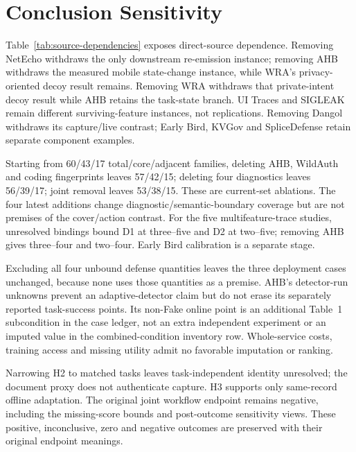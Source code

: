 \section{Conclusion Sensitivity}\label{app:claim-sensitivity}\label{sec:claim-sensitivity}
Table~\ref{tab:source-dependencies} exposes direct-source dependence. Removing NetEcho withdraws the only downstream re-emission instance; removing AHB withdraws the measured mobile state-change instance, while WRA's privacy-oriented decoy result remains. Removing WRA withdraws that private-intent decoy result while AHB retains the task-state branch. UI Traces and SIGLEAK remain different surviving-feature instances, not replications. Removing Dangol withdraws its capture/live contrast; Early Bird, KVGov and SpliceDefense retain separate component examples.

Starting from 60/43/17 total/core/adjacent families, deleting AHB, WildAuth and coding fingerprints leaves 57/42/15; deleting four diagnostics leaves 56/39/17; joint removal leaves 53/38/15. These are current-set ablations. The four latest additions change diagnostic/semantic-boundary coverage but are not premises of the cover/action contrast. For the five multifeature-trace studies, unresolved bindings bound D1 at three--five and D2 at two--five; removing AHB gives three--four and two--four. Early Bird calibration is a separate stage.

Excluding all four unbound defense quantities leaves the three deployment cases unchanged, because none uses those quantities as a premise. AHB's detector-run unknowns prevent an adaptive-detector claim but do not erase its separately reported task-success points. Its non-Fake online point is an additional Table~1 subcondition in the case ledger, not an extra independent experiment or an imputed value in the combined-condition inventory row. Whole-service costs, training access and missing utility admit no favorable imputation or ranking.

Narrowing H2 to matched tasks leaves task-independent identity unresolved; the document proxy does not authenticate capture. H3 supports only same-record offline adaptation. The original joint workflow endpoint remains negative, including the missing-score bounds and post-outcome sensitivity views. These positive, inconclusive, zero and negative outcomes are preserved with their original endpoint meanings.
